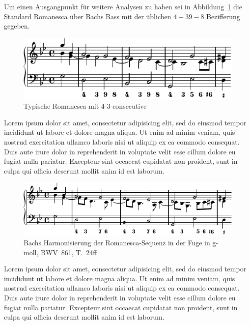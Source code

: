 Um einen Ausgangpunkt für weitere Analysen zu haben sei in Abbildung~\ref{fig:bwv681-romanesca-standard} die Standard Romanesca über Bachs Bass mit der üblichen $4-3 9-8$ Bezifferung gegeben.

\begin{figure}[htbp]
	\centering
	\includegraphics{lilypond/g-moll/render/romanesca-standard}
	\caption{Typische Romanesca mit 4-3-consecutive}
	\label{fig:bwv681-romanesca-standard}
\end{figure}

Lorem ipsum dolor sit amet, consectetur adipisicing elit, sed do eiusmod tempor incididunt ut labore et dolore magna aliqua. Ut enim ad minim veniam, quis nostrud exercitation ullamco laboris nisi ut aliquip ex ea commodo consequat. Duis aute irure dolor in reprehenderit in voluptate velit esse cillum dolore eu fugiat nulla pariatur. Excepteur sint occaecat cupidatat non proident, sunt in culpa qui officia deserunt mollit anim id est laborum.

\begin{figure}[htbp]
	\centering
	\includegraphics{lilypond/g-moll/render/romanesca-vorhalte}
	\caption{Bachs Harmonisierung der Romanesca-Sequenz in der Fuge in g-moll, BWV~861, T.~24ff}
	\label{fig:bwv681-vorhalte}
\end{figure}

Lorem ipsum dolor sit amet, consectetur adipisicing elit, sed do eiusmod tempor incididunt ut labore et dolore magna aliqua. Ut enim ad minim veniam, quis nostrud exercitation ullamco laboris nisi ut aliquip ex ea commodo consequat. Duis aute irure dolor in reprehenderit in voluptate velit esse cillum dolore eu fugiat nulla pariatur. Excepteur sint occaecat cupidatat non proident, sunt in culpa qui officia deserunt mollit anim id est laborum.
